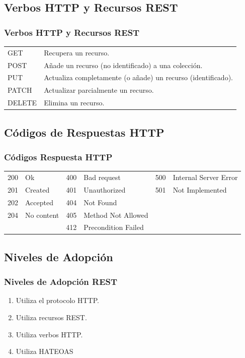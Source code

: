 \documentclass[a4paper,slidestop,xcolor=pst,blue]{beamer}
\begin{document}
\subsection{Verbos HTTP y Recursos REST}

\begin{frame}[c]
    \frametitle{Verbos HTTP y Recursos REST}
    \begin{tabular}{ll} \hline
        GET    & Recupera un recurso. \\
        POST   & Añade un recurso (no identificado) a una colección. \\
        PUT    & Actualiza completamente (o añade) un recurso (identificado). \\
        PATCH  & Actualizar parcialmente un recurso. \\
        DELETE & Elimina un recurso. \\ \hline
    \end{tabular}
\end{frame}

\subsection{Códigos de Respuestas HTTP}

\begin{frame}[c]
    \frametitle{Códigos Respuesta HTTP}
    \begin{center}
        \begin{tabular}{ll|ll|ll}
            200 & Ok         & 400 & Bad request  & 500 & Internal Server Error \\
            201 & Created    & 401 & Unauthorized & 501 & Not Implemented       \\
            202 & Accepted   & 404 & Not Found    &     & \\
            204 & No content & 405 & Method Not Allowed  & & \\
                &            & 412 & Precondition Failed & & \\
        \end{tabular}
    \end{center}
\end{frame}

\subsection{Niveles de Adopción}

\begin{frame}[c]
    \frametitle{Niveles de Adopción REST}
    \begin{enumerate}[<+->]
        \item Utiliza el protocolo HTTP.
        \item Utiliza recursos REST.
        \item Utiliza verbos HTTP.
        \item Utiliza HATEOAS
    \end{enumerate}
\end{frame}
\end{document}
